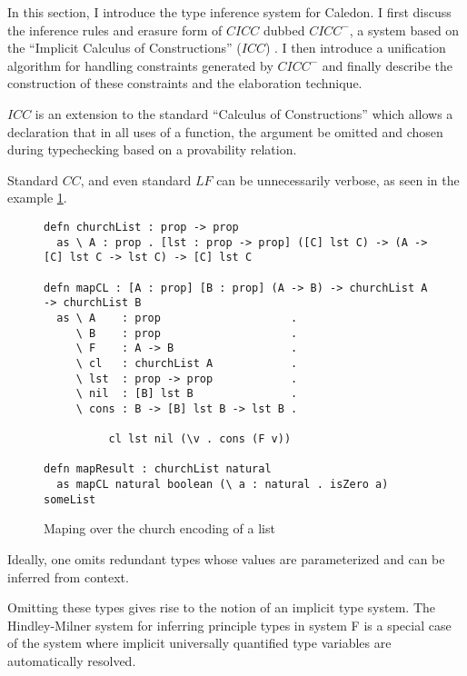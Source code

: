 In this section, I introduce the type inference system for Caledon. 
I first discuss the inference rules and 
erasure form of $CICC$ dubbed $CICC^-$, 
a system based on the ``Implicit Calculus of Constructions'' ($ICC$) \citep{pollack1990implicit}. 
I then introduce a unification algorithm for handling constraints generated by $CICC^-$ and finally 
describe the construction of these constraints and the elaboration technique.

$ICC$ is an extension to the standard ``Calculus of Constructions'' which allows
a declaration that in all uses of a function, the argument be omitted 
and chosen during typechecking based on a provability relation.

Standard $CC$, and even standard $LF$ 
can be unnecessarily verbose, as seen in the example \ref{code:long}.

\begin{figure}[h]
\begin{lstlisting}
defn churchList : prop -> prop
  as \ A : prop . [lst : prop -> prop] ([C] lst C) -> (A -> [C] lst C -> lst C) -> [C] lst C

defn mapCL : [A : prop] [B : prop] (A -> B) -> churchList A -> churchList B
  as \ A    : prop                    . 
     \ B    : prop                    .
     \ F    : A -> B                  . 
     \ cl   : churchList A            .
     \ lst  : prop -> prop            .
     \ nil  : [B] lst B               .
     \ cons : B -> [B] lst B -> lst B .

          cl lst nil (\v . cons (F v))

defn mapResult : churchList natural
  as mapCL natural boolean (\ a : natural . isZero a) someList

\end{lstlisting}
\caption{Maping over the church encoding of a list}
\label{code:long}
\end{figure}

Ideally, one omits redundant types whose values are parameterized 
and can be inferred from context. 

Omitting these types gives rise to the notion of an implicit type system.  
The Hindley-Milner \citep{hindley1969principal} system for inferring principle types in system F
is a special case of the system where implicit universally quantified type variables are automatically
resolved.
